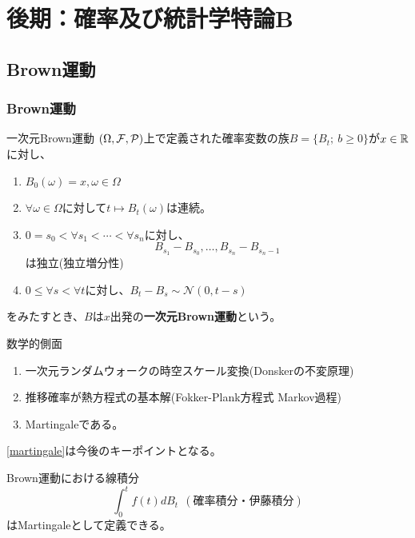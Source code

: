 \documentclass[dvipdfmx, leqno]{jsbook}
\begin{document}
\part{後期：確率及び統計学特論B}
\chapter{Brown運動}
\section{Brown運動}
\begin{soudef}{一次元Brown運動}
    $(\Omega, \mathcal{F}, \mathcal{P})$上で定義された確率変数の族$B= \{B_t;\ b\ge 0\}$が$x\in \mathbb{R}$に対し、
\begin{enumerate}
    \item $B_0(\omega)= x, \omega\in \Omega$
    \item $\forall \omega\in \Omega$に対して$t\mapsto B_t(\omega)$は連続。
    \item $0= s_0< \forall s_1< \cdots< \forall s_n$に対し、
\begin{equation*}
    B_{s_1}- B_{s_0}, \ldots, B_{s_n}- B_{s_n- 1}
\end{equation*}
    は独立(独立増分性)
    \item $0\le \forall s< \forall t$に対し、$B_t- B_s\sim \mathcal{N}(0, t- s)$
\end{enumerate}
    をみたすとき、$B$は$x$出発の\textbf{一次元Brown運動}という。
\end{soudef}

    数学的側面
\begin{enumerate}
    \item 一次元ランダムウォークの時空スケール変換(Donskerの不変原理)
    \item 推移確率が熱方程式の基本解(Fokker-Plank方程式 Markov過程)
    \item Martingaleである。\label{martingale}
\end{enumerate}
\begin{souremark}
    \ref{martingale}は今後のキーポイントとなる。
\end{souremark}

    Brown運動における線積分
\begin{equation}\label{eq:確率積分・伊藤積分}
    \int_0^t f(t) dB_t\ \ (確率積分・伊藤積分)
\end{equation}
    はMartingaleとして定義できる。
\end{document}

